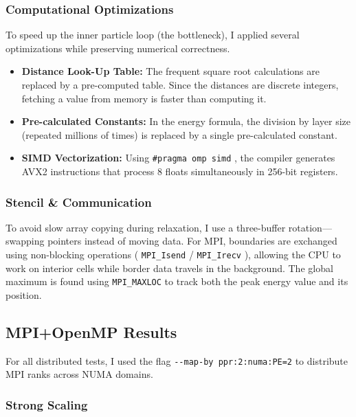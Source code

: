 \documentclass[10pt,dvipsnames,table,twocolumn]{article}
\let\oldtexttt\texttt
\renewcommand{\texttt}[1]{%
  {\small\colorbox{Mist}{\oldtexttt{\textcolor{DarkInk}{#1}}}}%
}
\begin{document}
\subsubsection{Computational Optimizations}

To speed up the inner particle loop (the bottleneck), I applied several optimizations while preserving numerical correctness.

\begin{itemize}
  \item \textbf{Distance Look-Up Table:} The frequent square root calculations are replaced by a pre-computed table. Since the distances are discrete integers, fetching a value from memory is faster than computing it.
  \item \textbf{Pre-calculated Constants:} In the energy formula, the division by layer size (repeated millions of times) is replaced by a single pre-calculated constant.
  \item \textbf{SIMD Vectorization:} Using \texttt{\#pragma~omp~simd}, the compiler generates AVX2 instructions that process 8 floats simultaneously in 256-bit registers.
\end{itemize}

\subsubsection{Stencil \& Communication}

To avoid slow array copying during relaxation, I use a three-buffer rotation---swapping pointers instead of moving data. For MPI, boundaries are exchanged using non-blocking operations (\texttt{MPI\_Isend}/\texttt{MPI\_Irecv}), allowing the CPU to work on interior cells while border data travels in the background. The global maximum is found using \texttt{MPI\_MAXLOC} to track both the peak energy value and its position.


\subsection{MPI+OpenMP Results}\label{sec:mpi-results}

For all distributed tests, I used the flag \texttt{-{}-map-by~ppr:2:numa:PE=2} to distribute MPI ranks across NUMA domains.

\subsubsection{Strong Scaling}
\end{document}
